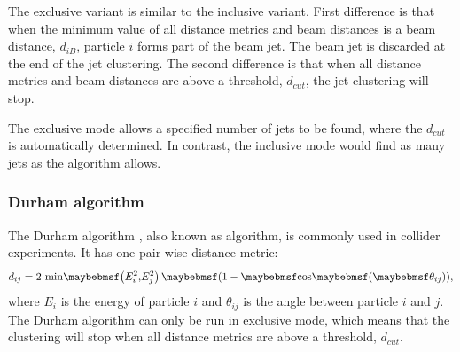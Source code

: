 

The exclusive variant is similar to the inclusive variant. First difference is that when the minimum value of all distance metrics and beam distances  is  a beam distance, $d_{iB}$, particle $i$ forms part of the beam jet. The beam jet is discarded at the end of the jet clustering. The second difference is that when all distance metrics and beam distances are above a threshold, $d_{cut}$, the jet clustering will stop.

The exclusive mode allows a specified number of jets to be found, where the $d_{cut}$ is automatically determined. In contrast, the inclusive mode would find as many jets as the algorithm allows.


\subsubsection{Durham algorithm}
\label{sec:pandoraJetDurham}
The Durham algorithm \cite{Catani:1991hj}, also known as \ee \kt algorithm, is commonly used in \ee collider experiments. It has one pair-wise distance metric:
\begin{equation}
d_{ij} = 2\,\min\!\parenths{E_i^2,\!E_j^2}\,\parenths{1 - \cosOf{\theta_{ij}}},
\end{equation}
where $E_i$ is the energy of particle $i$ and $\theta_{ij}$ is the angle between particle $i$ and $j$. The Durham algorithm can only be run in exclusive mode, which means that the clustering will stop when all distance metrics are above a threshold, $d_{cut}$.




